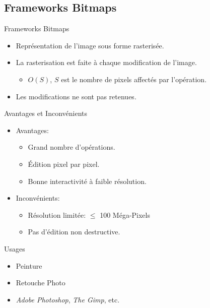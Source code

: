 \documentclass[slidetop,compress,mathserif]{beamer}
\begin{document}
	\subsection{Frameworks Bitmaps}
	\begin{frame}{Frameworks Bitmaps}
		\begin{itemize}
		\item Représentation de l'image sous forme rasterisée.
		\item La rasterisation est faite à chaque modification de l'image.
			\pause
			\begin{itemize}
				\item $O(S)$, $S$ est le nombre de pixels affectés par l'opération.
			\end{itemize}
		\pause
		\item Les modifications ne sont pas retenues.
		\end{itemize}
	\end{frame}
	\begin{frame}{Avantages et Inconvénients}
		\begin{itemize}
			
			\item Avantages: 
			\begin{itemize}
				\item Grand nombre d'opérations.
				\item Édition pixel par pixel.
				\item Bonne interactivité à faible résolution.
			\end{itemize}
			\pause
			\item Inconvénients: 
			\begin{itemize}
				\item Résolution limitée: $\leq$ 100 Méga-Pixels
				\item Pas d'édition non destructive. 
			\end{itemize}
		\end{itemize}
	\end{frame}
	
	\begin{frame}{Usages}
		\begin{itemize}
			\item Peinture
			\item Retouche Photo
			\pause
			\item \emph{Adobe Photoshop}, \emph{The Gimp}, etc.
		\end{itemize}
	\end{frame}
\end{document}
